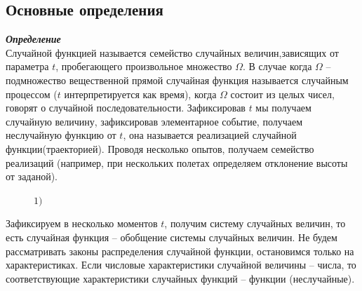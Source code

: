 \documentclass[russian, 12pt, fleqn,x11names]{article}
\begin{document}
\subsection{Основные определения}
\noindent
\textit{\textbf{Определение}}\\ 
Случайной функцией называется семейство случайных величин,зависящих от параметра $t$, пробегающего произвольное множество $\Omega$. В случае когда $\Omega$ -- подмножество вещественной прямой случайная функция называется случайным процессом ($t$ интерпретируется как время), когда $\Omega$ состоит из целых чисел, говорят о случайной последовательности. 
Зафиксировав $t$ мы получаем случайную величину, зафиксировав элементарное событие, получаем неслучайную функцию от $t$, она называется реализацией случайной 
функции(траекторией). Проводя несколько опытов, получаем семейство реализаций (например, при нескольких полетах определяем отклонение высоты от заданой). \\
\begin{figure}[!h]
\caption{$1)$}
\end{figure}
\noindent
Зафиксируем в несколько моментов $t$, получим систему случайных величин, то есть случайная функция -- обобщение системы случайных величин. 
Не будем рассматривать законы распределения случайной функции, остановимся только на характеристиках. Если числовые характеристики случайной величины -- числа, то соответствующие характеристики случайных функций -- функции (неслучайные).\\
\end{document}
